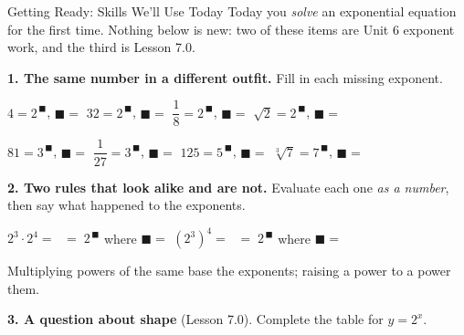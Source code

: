 \documentclass[10pt]{article}
\begin{document}
\namedateperiod

\vspace{0.10in}

\begin{notesbox}{Getting Ready: Skills We'll Use Today}
\small Today you \emph{solve} an exponential equation for the first time. Nothing below is new: two of
these items are Unit 6 exponent work, and the third is Lesson 7.0.

\vspace{5pt}
\textbf{1. The same number in a different outfit.} Fill in each missing exponent.

\vspace{4pt}
\hspace*{1.2em} $4 = 2^{\,\blacksquare}$, \; $\blacksquare=$ \blank{1.1cm} \qquad
$32 = 2^{\,\blacksquare}$, \; $\blacksquare=$ \blank{1.1cm} \qquad
$\dfrac{1}{8} = 2^{\,\blacksquare}$, \; $\blacksquare=$ \blank{1.1cm} \qquad
$\sqrt{2} = 2^{\,\blacksquare}$, \; $\blacksquare=$ \blank{1.1cm}

\vspace{5pt}
\hspace*{1.2em} $81 = 3^{\,\blacksquare}$, \; $\blacksquare=$ \blank{1.1cm} \qquad
$\dfrac{1}{27} = 3^{\,\blacksquare}$, \; $\blacksquare=$ \blank{1.1cm} \qquad
$125 = 5^{\,\blacksquare}$, \; $\blacksquare=$ \blank{1.1cm} \qquad
$\sqrt[3]{7} = 7^{\,\blacksquare}$, \; $\blacksquare=$ \blank{1.1cm}

\vspace{0.32in}

\textbf{2. Two rules that look alike and are not.} Evaluate each one \emph{as a number}, then say what
happened to the exponents.

\vspace{4pt}
\hspace*{1.2em} $2^{3}\cdot 2^{4} =$ \blank{1.8cm} $\;=\; 2^{\,\blacksquare}$ where $\blacksquare=$
\blank{1.1cm} \qquad
$\left(2^{3}\right)^{4} =$ \blank{1.8cm} $\;=\; 2^{\,\blacksquare}$ where $\blacksquare=$
\blank{1.1cm}

\vspace{4pt}
\hspace*{1.2em} Multiplying powers of the same base \blank{2.2cm} the exponents; raising a power to a
power \blank{2.2cm} them.

\vspace{0.38in}

\textbf{3. A question about shape} (Lesson 7.0). Complete the table for $y=2^{x}$.


\end{notesbox}
\end{document}
